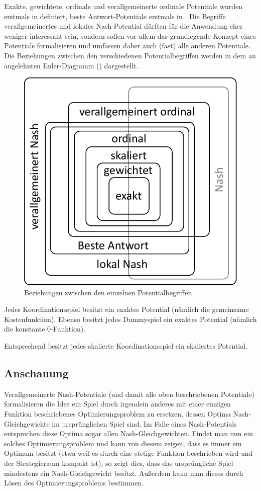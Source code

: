 Exakte, gewichtete, ordinale und verallgemeinerte ordinale Potentiale wurden erstmals in \cite{MonShap} definiert, beste Antwort-Potentiale erstmals in \cite{BestRespPot}. Die Begriffe verallgemeinertes und lokales Nash-Potential dürften für die Anwendung eher weniger interessant sein, sondern sollen vor allem das grundlegende Konzept eines Potentials formalisieren und umfassen daher auch (fast) alle anderen Potentiale. Die Beziehungen zwischen den verschiedenen Potentialbegriffen werden in dem an \cite[Abbildung 1]{BestRespPot} angelehnten Euler-Diagramm () dargestellt.

\begin{figure}[h]\centering
	\includegraphics[width=.4\textwidth]{../Bilder/EulerDiagPotentiale.pdf}
	\caption{Beziehungen zwischen den einzelnen Potentialbegriffen}\label{diag:Potentiale}
\end{figure}

\begin{bsp}
	Jedes Koordinationsspiel besitzt ein exaktes Potential (nämlich die gemeinsame Kostenfunktion). Ebenso besitzt jedes Dummyspiel ein exaktes Potential (nämlich die konstante $0$-Funktion).
	
	Entsprechend besitzt jedes skalierte Koordinationsspiel ein skaliertes Potential.
\end{bsp}

\subsection{Anschauung}

Verallgemeinerte Nash-Potentiale (und damit alle oben beschriebenen Potentiale) formalisieren die Idee ein Spiel durch irgendein anderes mit einer einzigen Funktion beschriebenes Optimierungsproblem zu ersetzen, dessen Optima Nash-Gleichgewichte im ursprünglichen Spiel sind. Im Falle eines Nash-Potentials entsprechen diese Optima sogar allen Nash-Gleichgewichten. Findet man nun ein solches Optimierungsproblem und kann von diesem zeigen, dass es immer ein Optimum besitzt (etwa weil es durch eine stetige Funktion beschrieben wird und der Strategieraum kompakt ist), so zeigt dies, dass das ursprüngliche Spiel mindestens ein Nash-Gleichgewicht besitzt. Außerdem kann man dieses durch Lösen des Optimierungsproblems bestimmen.

